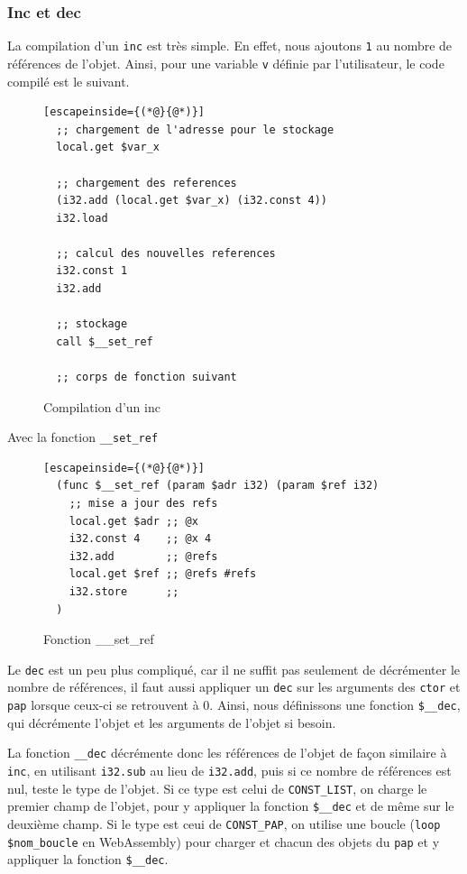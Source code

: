 \documentclass{rapportECL}
\begin{document}
\subsubsection{Inc et dec}

La compilation d'un \verb|inc| est très simple. En effet, nous ajoutons \verb|1| au nombre de références de l'objet. 
Ainsi, pour une variable \verb|v| définie par l'utilisateur, le code compilé est le suivant.

\begin{figure}[H]
	\begin{lstlisting}[escapeinside={(*@}{@*)}]
  ;; chargement de l'adresse pour le stockage
  local.get $var_x

  ;; chargement des references
  (i32.add (local.get $var_x) (i32.const 4))
  i32.load
   
  ;; calcul des nouvelles references
  i32.const 1
  i32.add

  ;; stockage
  call $__set_ref

  ;; corps de fonction suivant
	\end{lstlisting}
	\caption{Compilation d'un inc}
	\label{listing:compile_inc}
\end{figure}

Avec la fonction \verb|__set_ref|

\begin{figure}[H]
	\begin{lstlisting}[escapeinside={(*@}{@*)}]
  (func $__set_ref (param $adr i32) (param $ref i32)
    ;; mise a jour des refs
    local.get $adr ;; @x
    i32.const 4    ;; @x 4
    i32.add        ;; @refs
    local.get $ref ;; @refs #refs
    i32.store      ;;
  )
	\end{lstlisting}
	\caption{Fonction \_\_set\_ref}
	\label{listing:set_ref}
\end{figure}

Le \verb|dec| est un peu plus compliqué, car il ne suffit pas seulement de décrémenter le nombre de références, il faut aussi appliquer un \verb|dec| sur les arguments des \verb|ctor| et \verb|pap| lorsque ceux-ci se retrouvent à 0.
Ainsi, nous définissons une fonction \verb|$__dec|, qui décrémente l'objet et les arguments de l'objet si besoin.

La fonction \verb|__dec| décrémente donc les références de l'objet de façon similaire à \verb|inc|, en utilisant \verb|i32.sub| au lieu de \verb|i32.add|, puis si ce nombre de références est nul, teste le type de l'objet. Si ce type est celui de \verb|CONST_LIST|, on charge le premier champ de l'objet, pour y appliquer la fonction \verb|$__dec| et de même sur le deuxième champ. Si le type est ceui de \verb|CONST_PAP|, on utilise une boucle (\verb|loop $nom_boucle| en WebAssembly) pour charger et chacun des objets du \verb|pap| et y appliquer la fonction \verb|$__dec|.
\end{document}
